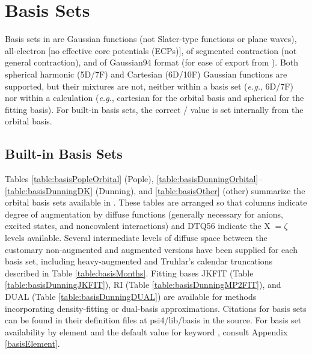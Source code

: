 \section{Basis Sets}

Basis sets in \PSIfour are Gaussian functions (not Slater-type functions or plane waves), 
all-electron [no effective core potentials (ECPs)], of segmented contraction (not general contraction), 
and of Gaussian94 format (for ease of export from ). 
Both spherical harmonic (5D/7F) and Cartesian (6D/10F) Gaussian functions are supported, 
but their mixtures are not, neither within a basis set (\textit{e.g.}, 6D/7F) nor within a calculation
(\textit{e.g.}, cartesian for the orbital basis and spherical for the fitting basis).
For built-in basis sets, the correct / value is set internally from the orbital basis.


\subsection{Built-in Basis Sets}
Tables \ref{table:basisPopleOrbital} (Pople), \ref{table:basisDunningOrbital}--\ref{table:basisDunningDK} (Dunning), 
and \ref{table:basisOther} (other) summarize the orbital basis sets available in \PSIfour. 
These tables are arranged so that columns indicate degree of augmentation by diffuse functions 
(generally necessary for anions, excited states, and noncovalent interactions)
and DTQ56 indicate the X$\;=\zeta$ levels available.
Several intermediate levels of diffuse space between the customary non-augmented and augmented versions have been
supplied for each basis set, including heavy-augmented and Truhlar's\cite{Papajak:2011:10} calendar truncations 
described in Table \ref{table:basisMonths}.
Fitting bases JKFIT (Table \ref{table:basisDunningJKFIT}), RI (Table \ref{table:basisDunningMP2FIT}), and
DUAL (Table \ref{table:basisDunningDUAL}) are available for methods incorporating density-fitting or
dual-basis approximations.
Citations for basis sets can be found in their definition files at psi4/lib/basis in the source.
For basis set availability by element and the default value for keyword , consult Appendix \ref{basisElement}.




